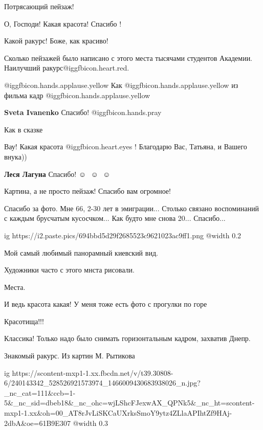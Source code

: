  
 
 
 
 



Потрясающий пейзаж!

О, Господи! Какая красота! Спасибо !

Какой ракурс! Боже, как красиво!

Сколько пейзажей было написано с этого места тысячами студентов Академии. Наилучший ракурс@igg{fbicon.heart.red}.

 @igg{fbicon.hands.applause.yellow} Как @igg{fbicon.hands.applause.yellow}  из фильма кадр  @igg{fbicon.hands.applause.yellow} 

\textbf{Sveta Ivanenko} Спасибо! @igg{fbicon.hands.pray} 

Как в сказке

Вау! Какая красота  @igg{fbicon.heart.eyes} ! Благодарю Вас, Татьяна, и Вашего внука))

\textbf{Леся Лагуна} Спасибо! ☺ ️  ☺ ️  ☺ ️ 

Картина, а не просто пейзаж! Спасибо вам огромное!


Спасибо за фото. Мне 66, 2-30 лет в эмиграции... Столько связано воспоминаний с
каждым брусчатым кусосчком... Как будто мне снова 20... Спасибо...


\ifcmt
  ig https://i2.paste.pics/694bbd5d29f2685523c9621023ac9ff1.png
  @width 0.2
\fi

Мой самый любимый панорамный киевский вид.

Художники часто с этого мнста рисовали.

Места.

И ведь красота какая! У меня тоже есть фото с прогулки по горе

Красотища!!!

Классика! Только надо было снимать горизонтальным кадром, захватив Днепр.

Знакомый ракурс. Из картин М. Рытикова

\ifcmt
  ig https://scontent-mxp1-1.xx.fbcdn.net/v/t39.30808-6/240143342_528526921573974_1466009430683938026_n.jpg?_nc_cat=111&ccb=1-5&_nc_sid=dbeb18&_nc_ohc=wjLShcFJexwAX_QPNk5&_nc_ht=scontent-mxp1-1.xx&oh=00_AT8rJvLiSKCaUXrksSmoY9ytz4ZLlaAPIhtZf9HAj-2dbA&oe=61B9E307
  @width 0.3
\fi
